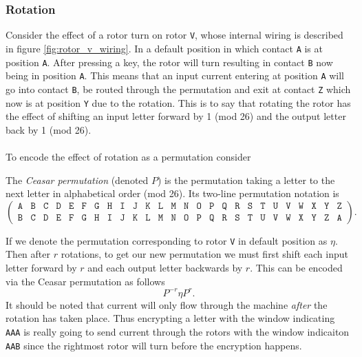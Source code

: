 \subsubsection{Rotation}

Consider the effect of a rotor turn on rotor \texttt{V}, whose
internal wiring is described in figure \ref{fig:rotor_v_wiring}.
In a default position in which contact \texttt{A} is at position
\texttt{A}. After pressing a key, the rotor
will turn resulting in contact \texttt{B} now being in position
\texttt{A}. This means that an input current
entering at position \texttt{A} will go into contact \texttt{B}, be
routed through the permutation and exit at contact
\texttt{Z} which now is at position \texttt{Y} due to the rotation.
This is to say that rotating the rotor has the effect
of shifting an input letter forward by 1 (mod 26) and the output
letter back by 1 (mod 26).
\\\\To encode the effect of rotation as a permutation consider
\begin{definition}
	The \emph{Ceasar permutation} (denoted $P$) is the permutation
	taking a letter to the next letter in alphabetical order (mod 26).
	Its two-line permutation notation is
	\[
		\left(
		\begin{array}{llllllllllllllllllllllllll}
				\texttt{A} & \texttt{B} & \texttt{C} & \texttt{D} &
				\texttt{E} & \texttt{F} & \texttt{G} & \texttt{H} &
				\texttt{I} & \texttt{J} & \texttt{K} & \texttt{L} &
				\texttt{M} & \texttt{N} & \texttt{O} & \texttt{P} &
				\texttt{Q} & \texttt{R} & \texttt{S} & \texttt{T} &
				\texttt{U} & \texttt{V} & \texttt{W} & \texttt{X} &
				\texttt{Y} & \texttt{Z}                             \\
				\texttt{B} & \texttt{C} & \texttt{D} &
				\texttt{E} & \texttt{F} & \texttt{G} & \texttt{H} &
				\texttt{I} & \texttt{J} & \texttt{K} & \texttt{L} &
				\texttt{M} & \texttt{N} & \texttt{O} & \texttt{P} &
				\texttt{Q} & \texttt{R} & \texttt{S} & \texttt{T} &
				\texttt{U} & \texttt{V} & \texttt{W} & \texttt{X} &
				\texttt{Y} & \texttt{Z} & \texttt{A}
			\end{array}
		\right).
	\]
\end{definition}
If we denote the permutation corresponding to rotor \texttt{V} in
default position as $\eta$. Then after $r$ rotations, to get
our new permutation we must first shift each input letter forward by
$r$ and each output letter backwards by $r$. This can be encoded via
the Ceasar permutation as follows
\[
	{P^{-r}}\eta{P^{r}}.
\]
\noindent It should be noted that current will only flow through the
machine \emph{after} the rotation has taken place. Thus encrypting a
letter with the window indicating \texttt{AAA} is really going to
send current through the rotors with the window indicaiton
\texttt{AAB} since the rightmost rotor will turn before the encryption happens.
